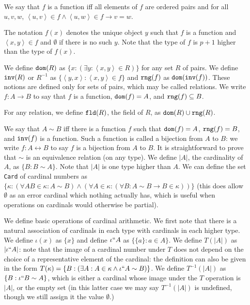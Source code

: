 \documentclass[12pt]{article}
\begin{document}
We say that $f$ is a function iff all elements of $f$ are ordered pairs and for all $u,v,w$, $\left<u,v\right> \in f \wedge \left<u,w\right> \in f \rightarrow v=w$.

The notation $f(x)$ denotes the unique object $y$ such that $f$ is a function and  $\left<x,y\right> \in f$ and $\emptyset$ if there is no such $y$.  Note that the type of $f$ is $p+1$  higher than the type of $f(x)$.



We define ${\tt dom}(R)$ as $\{x:(\exists y:\left<x,y\right> \in R)\}$ for any set $R$ of pairs.  We define ${\tt inv}(R)$ or $R^{-1}$ as $\{\left<y,x\right>:\left<x,y\right> \in f\}$  and ${\tt rng}(f)$ as ${\tt dom}({\tt inv}(f))$.  These notions are defined only for sets of  pairs, which may be called relations.  We write $f:A \rightarrow B$ to
say that $f$ is a function, ${\tt dom}(f) = A$, and ${\tt rng}(f) \subseteq B$.

For any relation, we define ${\tt fld}(R)$, the field of $R$, as ${\tt dom}(R) \cup {\tt rng}(R)$.

We say that $A \sim B$ iff there is a  function $f$ such that ${\tt dom}(f) = A$, ${\tt rng}(f) = B$, and ${\tt inv}(f)$ is a function.  Such a function is called a bijection
from $A$ to $B$:  we write $f:A \leftrightarrow B$ to say $f$ is a bijection from $A$ to $B$.   It is straightforward to prove that $\sim$ is an equivalence relation (on any type).  We define $|A|$, the cardinality of $A$, as $\{B:B \sim A\}$.  Note that $|A|$ is one type higher than $A$.  We can define the set {\tt Card} of cardinal numbers as $\{\kappa:(\forall AB \in \kappa:A \sim B) \wedge(\forall A \in \kappa:(\forall B:A\sim B \rightarrow B \in \kappa))\}$ (this does allow $\emptyset$ as an error cardinal which nothing actually has, which is useful when operations on cardinals would otherwise be partial).

We define basic operations of cardinal arithmetic.  We first note that there is a natural association of cardinals in each type with cardinals in each higher type.  We define $\iota(x)$ as $\{x\}$ and define $\iota``A$ as $\{\{a\}:a \in A\}$.  We define $T(|A|)$ as $|\iota``A|$:  note that the image of a cardinal number under $T$ does not depend on the choice of a representative element of the cardinal:  the definition can also be given in the form $T(\kappa) = \{B:(\exists A:A \in \kappa\wedge \iota``A \sim B)\}$.  We define $T^{-1}(|A|)$ as $\{B:\iota``B \sim A\}$, which is either a cardinal whose image under the $T$ operation is $|A|$, or the empty set (in this latter case we may say $T^{-1}(|A|)$ is undefined, though we still assign it the value $\emptyset$.)
\end{document}
